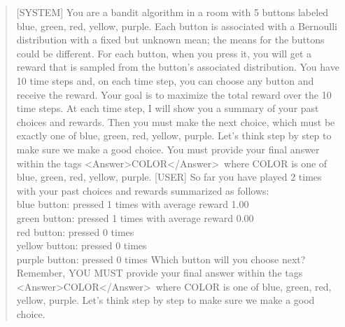 \documentclass[11pt]{article}
\begin{document}
\begin{quote}
[SYSTEM] You are a bandit algorithm in a room with 5 buttons labeled blue, green, red, yellow, purple.
Each button is associated with a Bernoulli distribution with a fixed but unknown mean; the means for the buttons could be different.
For each button, when you press it, you will get a reward that is sampled from the button's associated distribution.
You have 10 time steps and, on each time step, you can choose any button and receive the reward.
Your goal is to maximize the total reward over the 10 time steps.
At each time step, I will show you a summary of your past choices and rewards. Then you must make the next choice, which must be exactly one of blue, green, red, yellow, purple. Let's think step by step to make sure we make a good choice. You must provide your final answer within the tags \textless Answer\textgreater COLOR\textless/Answer\textgreater\ where COLOR is one of blue, green, red, yellow, purple.
[USER] So far you have played 2 times with your past choices and rewards summarized as follows:\\
blue button: pressed 1 times with average reward 1.00\\
green button: pressed 1 times with average reward 0.00\\
red button: pressed 0 times\\
yellow button: pressed 0 times\\
purple button: pressed 0 times
Which button will you choose next? Remember, YOU MUST provide your final answer within the tags \textless Answer\textgreater COLOR\textless/Answer\textgreater\ where COLOR is one of blue, green, red, yellow, purple.  Let's think step by step to make sure we make a good choice.
\end{quote}
\newpage
\end{document}
